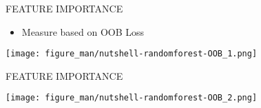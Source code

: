 \documentclass[11pt,compress,t,notes=noshow, xcolor=table]{beamer}
\begin{document}
\begin{vbframe}{FEATURE IMPORTANCE}

 \begin{itemize}
        \item \small Measure based on OOB Loss
    \end{itemize}

\begin{center}
    \texttt{[image: figure\_man/nutshell-randomforest-OOB\_1.png]}
\end{center}


\end{vbframe}



\begin{vbframe}{FEATURE IMPORTANCE}
\begin{center}
    \texttt{[image: figure\_man/nutshell-randomforest-OOB\_2.png]}
\end{center}


\end{vbframe}




\endlecture
\end{document}
